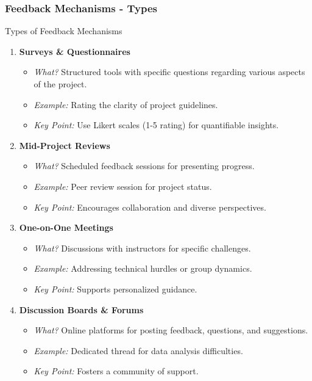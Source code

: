 \documentclass[aspectratio=169]{beamer}
\begin{document}
\begin{frame}[fragile]
    \frametitle{Feedback Mechanisms - Types}
    \begin{block}{Types of Feedback Mechanisms}
        \begin{enumerate}
            \item \textbf{Surveys \& Questionnaires}
                \begin{itemize}
                    \item \textit{What?} Structured tools with specific questions regarding various aspects of the project.
                    \item \textit{Example:} Rating the clarity of project guidelines.
                    \item \textit{Key Point:} Use Likert scales (1-5 rating) for quantifiable insights.
                \end{itemize}

            \item \textbf{Mid-Project Reviews}
                \begin{itemize}
                    \item \textit{What?} Scheduled feedback sessions for presenting progress.
                    \item \textit{Example:} Peer review session for project status.
                    \item \textit{Key Point:} Encourages collaboration and diverse perspectives.
                \end{itemize}

            \item \textbf{One-on-One Meetings}
                \begin{itemize}
                    \item \textit{What?} Discussions with instructors for specific challenges.
                    \item \textit{Example:} Addressing technical hurdles or group dynamics.
                    \item \textit{Key Point:} Supports personalized guidance.
                \end{itemize}

            \item \textbf{Discussion Boards \& Forums}
                \begin{itemize}
                    \item \textit{What?} Online platforms for posting feedback, questions, and suggestions.
                    \item \textit{Example:} Dedicated thread for data analysis difficulties.
                    \item \textit{Key Point:} Fosters a community of support.
                \end{itemize}


\end{enumerate}
\end{block}
\end{frame}
\end{document}
